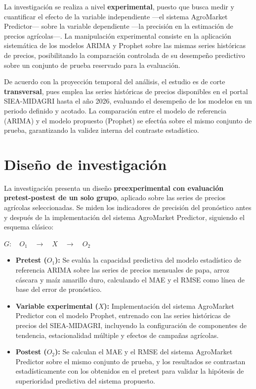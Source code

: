 \documentclass[12pt, a4paper]{report}
\begin{document}
La investigación se realiza a nivel \textbf{experimental}, puesto que busca medir y cuantificar el efecto de la variable independiente —el sistema AgroMarket Predictor— sobre la variable dependiente —la precisión en la estimación de precios agrícolas—. La manipulación experimental consiste en la aplicación sistemática de los modelos ARIMA y Prophet sobre las mismas series históricas de precios, posibilitando la comparación controlada de su desempeño predictivo sobre un conjunto de prueba reservado para la evaluación.

De acuerdo con la proyección temporal del análisis, el estudio es de corte \textbf{transversal}, pues emplea las series históricas de precios disponibles en el portal SIEA-MIDAGRI hasta el año 2026, evaluando el desempeño de los modelos en un periodo definido y acotado. La comparación entre el modelo de referencia (ARIMA) y el modelo propuesto (Prophet) se efectúa sobre el mismo conjunto de prueba, garantizando la validez interna del contraste estadístico.

\section{Diseño de investigación}

La investigación presenta un diseño \textbf{preexperimental con evaluación pretest-postest de un solo grupo}, aplicado sobre las series de precios agrícolas seleccionadas. Se miden los indicadores de precisión del pronóstico antes y después de la implementación del sistema AgroMarket Predictor, siguiendo el esquema clásico:

\begin{center}
  $G:\quad O_1 \quad\longrightarrow\quad X \quad\longrightarrow\quad O_2$
\end{center}

\begin{itemize}
  \item \textbf{Pretest ($O_1$):} Se evalúa la capacidad predictiva del modelo estadístico de referencia ARIMA sobre las series de precios mensuales de papa, arroz cáscara y maíz amarillo duro, calculando el MAE y el RMSE como línea de base del error de pronóstico.

  \item \textbf{Variable experimental ($X$):} Implementación del sistema AgroMarket Predictor con el modelo Prophet, entrenado con las series históricas de precios del SIEA-MIDAGRI, incluyendo la configuración de componentes de tendencia, estacionalidad múltiple y efectos de campañas agrícolas.

  \item \textbf{Postest ($O_2$):} Se calculan el MAE y el RMSE del sistema AgroMarket Predictor sobre el mismo conjunto de prueba, y los resultados se contrastan estadísticamente con los obtenidos en el pretest para validar la hipótesis de superioridad predictiva del sistema propuesto.
\end{itemize}
\end{document}
